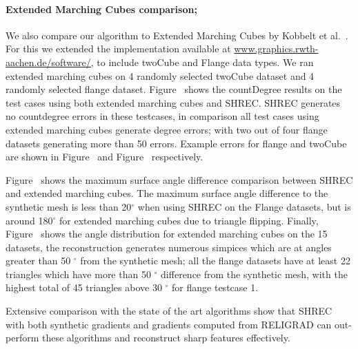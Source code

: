 \paragraph{Extended Marching Cubes comparison;}

We also compare our algorithm to Extended Marching Cubes by Kobbelt et al.~\cite{kbsh-fssev-01}. For this we extended the implementation available at 
\href{https://www.graphics.rwth-aachen.de/software/}{www.graphics.rwth-aachen.de/software/},
to include twoCube and Flange data types. We ran extended marching cubes on 4 randomly selected twoCube dataset and 4 randomly selected flange dataset. Figure~\protect{} shows the countDegree results on the test cases using both extended marching cubes and SHREC. SHREC generates no countdegree errors in these testcases, in comparison all test cases using extended marching cubes generate degree errors; with two out of four flange datasets generating more than 50 errors.
Example errors for flange and twoCube are shown in
Figure~\protect{} and
Figure~\protect{} respectively.

Figure~\protect{} shows the maximum surface angle difference comparison between SHREC and extended marching cubes. The maximum surface angle difference to the synthetic mesh is less than 20$^\circ$ when using SHREC on the Flange datasets, but is around 180$^\circ$ for extended marching cubes due to triangle flipping. Finally, Figure~\protect{} shows the angle distribution for extended marching cubes on the 15 datasets, the reconstruction generates numerous simpices which are at angles greater than 50 $^\circ$ from the synthetic mesh; all the flange datasets have at least 22 triangles which have more than 50  $^\circ$ difference from the synthetic mesh, with the highest total of 45 triangles above 30 $^\circ$ for flange testcase 1.


Extensive comparison with the state of the art algorithms show that SHREC with both synthetic gradients and gradients computed from RELIGRAD can out-perform these algorithms and reconstruct sharp features effectively. 


